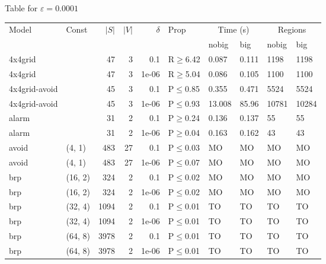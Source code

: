 \small Table for \(\varepsilon=0.0001\)
\begin{longtable}{llrrrlllll}

        \toprule
        Model & Const & $|S|$ & $|V|$ & $\delta$ & Prop & \multicolumn{2}{c}{Time (s)} & \multicolumn{2}{c}{Regions} \\
        \cmidrule(ll){7-8} \cmidrule(ll){9-10}
        & & & & & & nobig & big & nobig & big \\
        \midrule
        
 4x4grid       &           &     	47 &   3 & 0.1   & R$\geq$6.42  & 0.087    & 0.111    & 1198   & 1198   \\
 4x4grid       &           &     	47 &   3 & 1e-06 & R$\geq$5.04  & 0.086    & 0.105    & 1100   & 1100   \\
 4x4grid-avoid &           &     	45 &   3 & 0.1   & P$\leq$0.85  & 0.355    & 0.471    & 5524   & 5524   \\
 4x4grid-avoid &           &     	45 &   3 & 1e-06 & P$\leq$0.93  & 13.008   & 85.96    & 10781  & 10284  \\
 alarm         &           &     	31 &   2 & 0.1   & P$\geq$0.24  & 0.136    & 0.137    & 55     & 55     \\
 alarm         &           &     	31 &   2 & 1e-06 & P$\geq$0.04  & 0.163    & 0.162    & 43     & 43     \\
 avoid         & (4, 1)    &    	483 &  27 & 0.1   & P$\leq$0.03  & MO       & MO       & MO     & MO     \\
 avoid         & (4, 1)    &    	483 &  27 & 1e-06 & P$\leq$0.07  & MO       & MO       & MO     & MO     \\
 brp           & (16, 2)   &    	324 &   2 & 0.1   & P$\leq$0.02  & MO       & MO       & MO     & MO     \\
 brp           & (16, 2)   &    	324 &   2 & 1e-06 & P$\leq$0.02  & MO       & MO       & MO     & MO     \\
 brp           & (32, 4)   &   	1094 &   2 & 0.1   & P$\leq$0.01  & TO       & TO       & TO     & TO     \\
 brp           & (32, 4)   &   	1094 &   2 & 1e-06 & P$\leq$0.01  & TO       & TO       & TO     & TO     \\
 brp           & (64, 8)   &   	3978 &   2 & 0.1   & P$\leq$0.01  & TO       & TO       & TO     & TO     \\
 brp           & (64, 8)   &   	3978 &   2 & 1e-06 & P$\leq$0.01  & TO       & TO       & TO     & TO     \\

\end{longtable}
